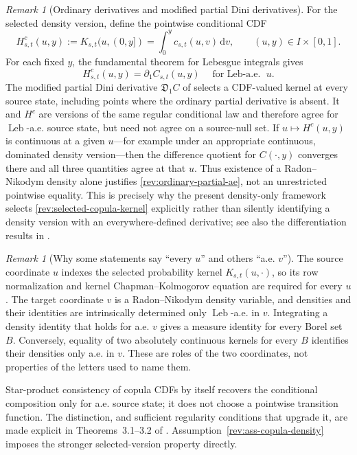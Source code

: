 \documentclass[11pt]{article}
\theoremstyle{remark}
\newtheorem{remark}[definition]{Remark}
\newcommand{\dd}{\,\mathrm d}
\newcommand{\Leb}{\operatorname{Leb}}
\begin{document}
\begin{remark}[Ordinary derivatives and modified partial Dini derivatives]
\label{rev:rem-modified-Dini}
For the selected density version, define the pointwise conditional CDF
\begin{equation}
H_{s,t}^{c}(u,y):=K_{s,t}(u,(0,y])
=\int_0^yc_{s,t}(u,v)\dd v,
\qquad (u,y)\in I\times[0,1].
\label{rev:selected-conditional-CDF}
\end{equation}
For each fixed $y$, the fundamental theorem for Lebesgue integrals gives
\begin{equation}
H_{s,t}^{c}(u,y)=\partial_1C_{s,t}(u,y)
\quad\text{for $\Leb$-a.e. }u.
\label{rev:ordinary-partial-ae}
\end{equation}
The modified partial Dini derivative $\mathfrak D_1C$ of
\citet[Definition~2.1 and Theorems~2.1--2.2]{FangJiangLiuYang2020} selects a
CDF-valued kernel at every source state, including points where the ordinary
partial derivative is absent.  It and $H^c$ are versions of the same regular
conditional law and therefore agree for $\Leb$-a.e. source state, but need not
agree on a source-null set.  If $u\mapsto H^c(u,y)$ is continuous at a given
$u$---for example under an appropriate continuous, dominated density
version---then the difference quotient for $C(\cdot,y)$ converges there and
all three quantities agree at that $u$.  Thus existence of a Radon--Nikodym
density alone justifies \eqref{rev:ordinary-partial-ae}, not an unrestricted
pointwise equality.  This is precisely why the present density-only framework
selects \eqref{rev:selected-copula-kernel} explicitly rather than silently
identifying a density version with an everywhere-defined derivative; see also
the differentiation results in \citet[Chapter~3]{Folland1999}.
\end{remark}

\begin{remark}[Why some statements say ``every $u$'' and others ``a.e. $v$'']
\label{rev:rem-quantifier-convention}
The source coordinate $u$ indexes the selected probability kernel
$K_{s,t}(u,\cdot)$, so its row normalization and kernel
Chapman--Kolmogorov equation are required for every $u$.  The target coordinate
$v$ is a Radon--Nikodym density variable, and densities and their identities are
intrinsically determined only $\Leb$-a.e. in $v$.  Integrating a density
identity that holds for a.e. $v$ gives a measure identity for every Borel set
$B$.  Conversely, equality of two absolutely continuous kernels for every
$B$ identifies their densities only a.e. in $v$.  These are roles of the two
coordinates, not properties of the letters used to name them.

Star-product consistency of copula CDFs by itself recovers the conditional
composition only for a.e. source state; it does not choose a pointwise
transition function.  The distinction, and sufficient regularity conditions
that upgrade it, are made explicit in Theorems~3.1--3.2 of
\citet{FangJiangLiuYang2020}.  Assumption~\ref{rev:ass-copula-density} imposes
the stronger selected-version property directly.
\end{remark}
\end{document}
